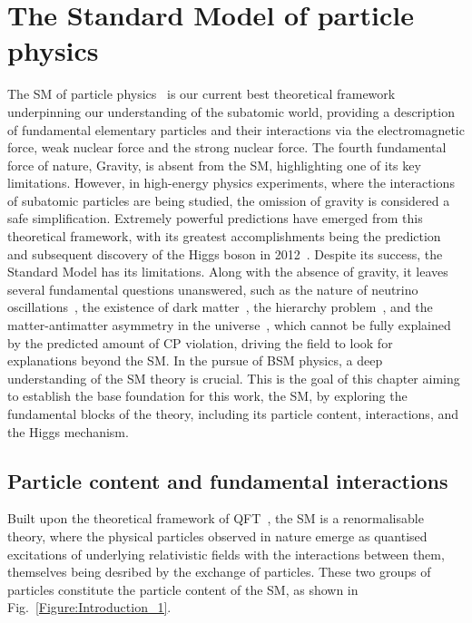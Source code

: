 \chapter{The Standard Model of particle physics}
\thispagestyle{plain}  %
\pagestyle{chapterpages}
\label{Section:Chapter1}
The \ac{SM} of particle physics~\cite{Glashow_StandardModel_1,Weinberg_StandardModel_1,StandardModel_3,Standard_Model4,StandardModel_3} is our current best theoretical framework underpinning our understanding of the subatomic world, providing a description of fundamental elementary particles and their interactions via the electromagnetic force, weak nuclear force and the strong nuclear force. The fourth fundamental force of nature, Gravity, is absent from the SM, highlighting one of its key limitations. However, in high-energy physics experiments, where the interactions of subatomic particles are being studied, the omission of gravity is considered a safe simplification. Extremely powerful predictions have emerged from this theoretical framework, with its greatest accomplishments being the prediction~\cite{Higgs_1} and subsequent discovery of the Higgs boson in 2012~\cite{Higgs_ATLAS,Higgs_CMS}. Despite its success, the Standard Model has its limitations. Along with the absence of gravity, it leaves several fundamental questions unanswered, such as the nature of neutrino oscillations~\cite{Neutrino_Oscillations}, the existence of dark matter~\cite{DarkMatter}, the hierarchy problem~\cite{HierarchyProblem}, and the matter-antimatter asymmetry in the universe~\cite{MatterAntimatter}, which cannot be fully explained by the predicted amount of CP violation, driving the field to look for explanations beyond the SM. In the pursue of \ac{BSM} physics, a deep understanding of the SM theory is crucial. This is the goal of this chapter aiming to establish the base foundation for this work, the SM, by exploring the fundamental blocks of the theory, including its particle content, interactions, and the Higgs mechanism.

\section{Particle content and fundamental interactions}

Built upon the theoretical framework of \ac{QFT}~\cite{QFT}, the SM is a renormalisable theory, where the physical particles observed in nature emerge as quantised excitations of underlying relativistic fields with the interactions between them, themselves being desribed by the exchange of particles. These two groups of particles constitute the particle content of the SM, as shown in Fig.~\ref{Figure:Introduction_1}.

